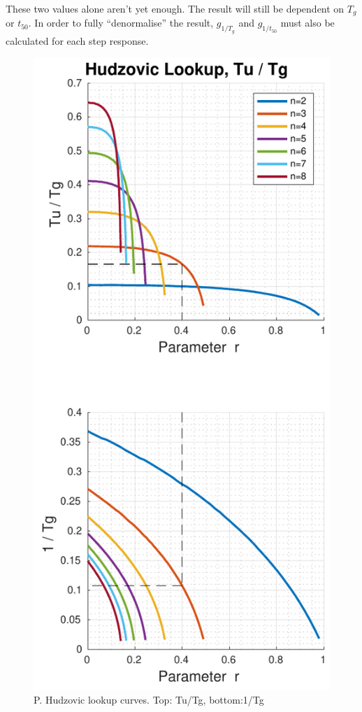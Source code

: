 These two values alone aren't yet enough. The  result will still be dependent on
$T_g$ or $t_{50}$. In order to fully ``denormalise'' the result, $g_{1/T_g}$ and
$g_{1/t_{50}}$ must also be calculated for each step response.

\clearpage

\begin{figure}[t]
    \includegraphics[width=\linewidth]{images/hudzovic_curves_tu_tg}
    \caption{P. Hudzovic lookup curves. Top: Tu/Tg, bottom:1/Tg}
    \label{fig:hudzovic_tu_tg}
\end{figure}
